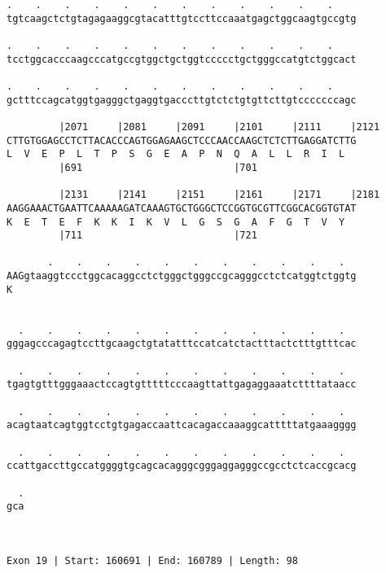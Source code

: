 \documentclass{article}
\begin{document}
\begin{Verbatim}
.    .    .    .    .    .    .    .    .    .    .    .    
tgtcaagctctgtagagaaggcgtacatttgtccttccaaatgagctggcaagtgccgtg
                                                            
.    .    .    .    .    .    .    .    .    .    .    .    
tcctggcacccaagcccatgccgtggctgctggtccccctgctgggccatgtctggcact
                                                            
.    .    .    .    .    .    .    .    .    .    .    .    
gctttccagcatggtgagggctgaggtgacccttgtctctgtgttcttgtcccccccagc
                                                            
         |2071     |2081     |2091     |2101     |2111     |2121
CTTGTGGAGCCTCTTACACCCAGTGGAGAAGCTCCCAACCAAGCTCTCTTGAGGATCTTG
L  V  E  P  L  T  P  S  G  E  A  P  N  Q  A  L  L  R  I  L  
         |691                          |701                 
  
         |2131     |2141     |2151     |2161     |2171     |2181
AAGGAAACTGAATTCAAAAAGATCAAAGTGCTGGGCTCCGGTGCGTTCGGCACGGTGTAT
K  E  T  E  F  K  K  I  K  V  L  G  S  G  A  F  G  T  V  Y  
         |711                          |721                 
  
       .    .    .    .    .    .    .    .    .    .    .  
AAGgtaaggtccctggcacaggcctctgggctgggccgcagggcctctcatggtctggtg
K                                                           
                                                            
  
  .    .    .    .    .    .    .    .    .    .    .    .  
gggagcccagagtccttgcaagctgtatatttccatcatctactttactctttgtttcac
                                                            
  .    .    .    .    .    .    .    .    .    .    .    .  
tgagtgtttgggaaactccagtgtttttcccaagttattgagaggaaatcttttataacc
                                                            
  .    .    .    .    .    .    .    .    .    .    .    .  
acagtaatcagtggtcctgtgagaccaattcacagaccaaaggcatttttatgaaagggg
                                                            
  .    .    .    .    .    .    .    .    .    .    .    .  
ccattgaccttgccatggggtgcagcacagggcgggaggagggccgcctctcaccgcacg
                                                            
  .
gca
   
   
 
Exon 19 | Start: 160691 | End: 160789 | Length: 98




\end{Verbatim}
\end{document}
